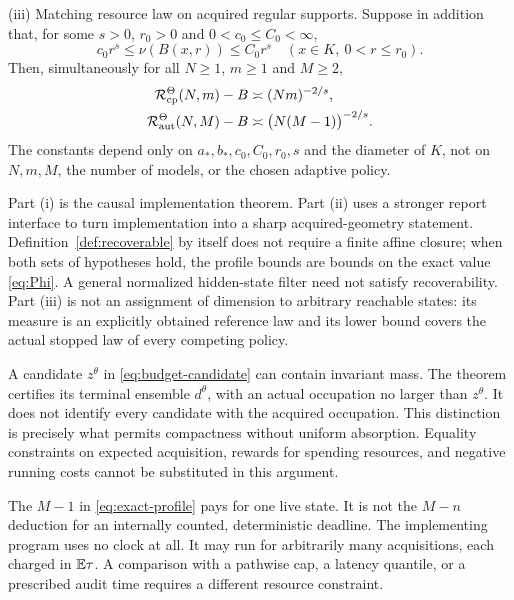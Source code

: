\begin{theorem}
\smallskip\noindent\textup{(iii) Matching resource law on acquired regular supports.}
Suppose in addition that, for some $s>0$, $r_0>0$ and $0<c_0\le C_0<\infty$,
\begin{equation}\label{eq:regularity}
 c_0r^s\le\nu(B(x,r))\le C_0r^s
 \quad(x\in K,\ 0<r\le r_0).
\end{equation}
Then, simultaneously for all $N\ge1$, $m\ge1$ and $M\ge2$,
\begin{align}
 \mathcal R_{\mathrm{cp}}^\Theta(N,m)-B&\asymp (Nm)^{-2/s},\label{eq:regular-cp}\\
 \mathcal R_{\mathrm{aut}}^\Theta(N,M)-B&\asymp \bigl(N(M-1)\bigr)^{-2/s}.\label{eq:regular-aut}
\end{align}
The constants depend only on $a_*,b_*,c_0,C_0,r_0,s$ and the diameter of $K$, not on $N,m,M$, the number of models, or the chosen adaptive policy.
\end{theorem}

Part (i) is the causal implementation theorem. Part (ii) uses a stronger report interface to turn implementation into a sharp acquired-geometry statement. Definition~\ref{def:recoverable} by itself does not require a finite affine closure; when both sets of hypotheses hold, the profile bounds are bounds on the exact value \eqref{eq:Phi}. A general normalized hidden-state filter need not satisfy recoverability. Part (iii) is not an assignment of dimension to arbitrary reachable states: its measure is an explicitly obtained reference law and its lower bound covers the actual stopped law of every competing policy.

\begin{remark}\label{rem:ghost}
A candidate $z^\theta$ in \eqref{eq:budget-candidate} can contain invariant mass. The theorem certifies its terminal ensemble $d^\theta$, with an actual occupation no larger than $z^\theta$. It does not identify every candidate with the acquired occupation. This distinction is precisely what permits compactness without uniform absorption. Equality constraints on expected acquisition, rewards for spending resources, and negative running costs cannot be substituted in this argument.
\end{remark}

\begin{remark}
The $M-1$ in \eqref{eq:exact-profile} pays for one live state. It is not the $M-n$ deduction for an internally counted, deterministic deadline. The implementing program uses no clock at all. It may run for arbitrarily many acquisitions, each charged in $\mathbb E\tau$. A comparison with a pathwise cap, a latency quantile, or a prescribed audit time requires a different resource constraint.
\end{remark}

